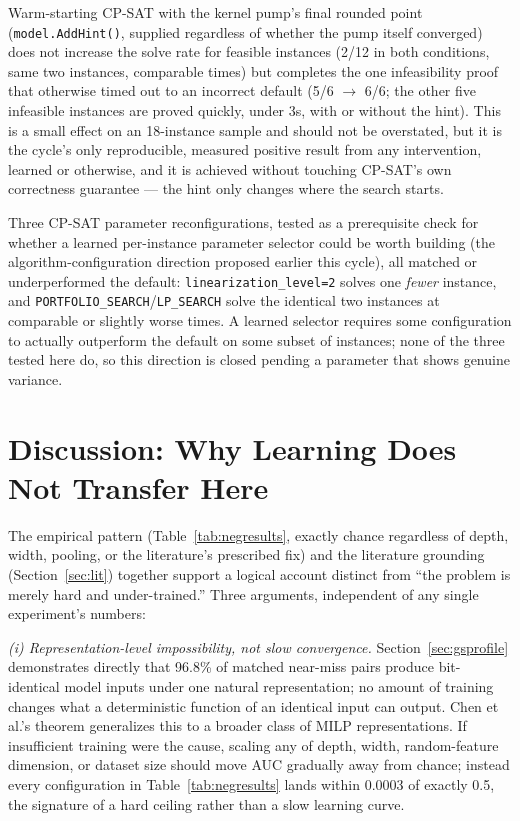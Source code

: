 \documentclass[12pt]{article}
\begin{document}
Warm-starting CP-SAT with the kernel pump's final rounded point (\texttt{model.AddHint()}, supplied regardless of whether the pump itself converged) does not increase the solve rate for feasible instances (2/12 in both conditions, same two instances, comparable times) but completes the one infeasibility proof that otherwise timed out to an incorrect default (5/6 $\to$ 6/6; the other five infeasible instances are proved quickly, under 3s, with or without the hint). This is a small effect on an 18-instance sample and should not be overstated, but it is the cycle's only reproducible, measured positive result from any intervention, learned or otherwise, and it is achieved without touching CP-SAT's own correctness guarantee --- the hint only changes where the search starts.

Three CP-SAT parameter reconfigurations, tested as a prerequisite check for whether a learned per-instance parameter selector could be worth building (the algorithm-configuration direction proposed earlier this cycle), all matched or underperformed the default: \texttt{linearization\_level=2} solves one \emph{fewer} instance, and \texttt{PORTFOLIO\_SEARCH}/\texttt{LP\_SEARCH} solve the identical two instances at comparable or slightly worse times. A learned selector requires some configuration to actually outperform the default on some subset of instances; none of the three tested here do, so this direction is closed pending a parameter that shows genuine variance.

\section{Discussion: Why Learning Does Not Transfer Here}
\label{sec:discussion}

The empirical pattern (Table~\ref{tab:negresults}, exactly chance regardless of depth, width, pooling, or the literature's prescribed fix) and the literature grounding (Section~\ref{sec:lit}) together support a logical account distinct from ``the problem is merely hard and under-trained.'' Three arguments, independent of any single experiment's numbers:

\emph{(i) Representation-level impossibility, not slow convergence.} Section~\ref{sec:gsprofile} demonstrates directly that 96.8\% of matched near-miss pairs produce bit-identical model inputs under one natural representation; no amount of training changes what a deterministic function of an identical input can output. Chen et al.'s theorem generalizes this to a broader class of MILP representations. If insufficient training were the cause, scaling any of depth, width, random-feature dimension, or dataset size should move AUC gradually away from chance; instead every configuration in Table~\ref{tab:negresults} lands within 0.0003 of exactly 0.5, the signature of a hard ceiling rather than a slow learning curve.
\end{document}
